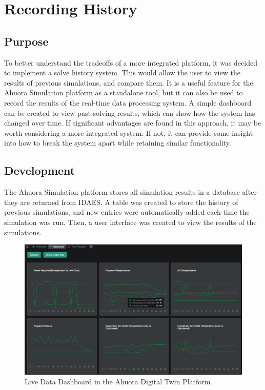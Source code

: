 \chapter{Recording History} \label{sec:history}

\section{Purpose}

To better understand the tradeoffs of a more integrated platform, it was decided to implement a solve history system. This would allow the user to view the results of previous simulations, and compare them. It is a useful feature for the Ahuora Simulation platform as a standalone tool, but it can also be used to record the results of the real-time data processing system. A simple dashboard can be created to view past solving results, which can show how the system has changed over time. If significant advantages are found in this approach, it may be worth considering a more integrated system. If not, it can provide some insight into how to break the system apart while retaining similar functionality.


\section{Development} \label{sec:recordinghistorydevelopment}

The Ahuora Simulation platform stores all simulation results in a database after they are returned from IDAES. A table was created to store the history of previous simulations, and new entries were automatically added each time the simulation was run. Then, a user interface was created to view the results of the simulations.

\begin{figure}
    \centering
    \includegraphics[width=\textwidth]{livedatadashboard.png}
    \caption{Live Data Dashboard in the Ahuora Digital Twin Platform}
    \label{fig:livedatadashboard}
\end{figure}

